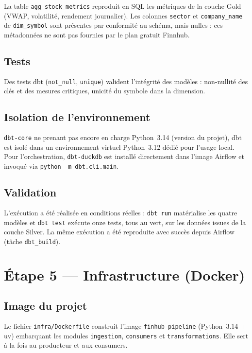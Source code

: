 \documentclass[11pt,a4paper]{article}
\newcommand{\code}[1]{\texttt{\small #1}}
\begin{document}
La table \code{agg\_stock\_metrics} reproduit en SQL les métriques de la couche
Gold (VWAP, volatilité, rendement journalier). Les colonnes
\code{sector} et \code{company\_name} de \code{dim\_symbol} sont présentes par
conformité au schéma, mais nulles : ces métadonnées ne sont pas fournies par le
plan gratuit Finnhub.

\subsection{Tests}

Des tests dbt (\code{not\_null}, \code{unique}) valident l'intégrité des
modèles : non-nullité des clés et des mesures critiques, unicité du symbole dans
la dimension.

\subsection{Isolation de l'environnement}

\code{dbt-core} ne prenant pas encore en charge Python~3.14 (version du projet),
dbt est isolé dans un environnement virtuel Python~3.12 dédié pour l'usage
local. Pour l'orchestration, \code{dbt-duckdb} est installé directement dans
l'image Airflow et invoqué via \code{python -m dbt.cli.main}.

\subsection{Validation}

L'exécution a été réalisée en conditions réelles : \code{dbt run} matérialise
les quatre modèles et \code{dbt test} exécute onze tests, tous au vert, sur les
données issues de la couche Silver. La même exécution a été reproduite avec
succès depuis Airflow (tâche \code{dbt\_build}).

\section{Étape 5 — Infrastructure (Docker)}

\subsection{Image du projet}

Le fichier \code{infra/Dockerfile} construit l'image \code{finhub-pipeline}
(Python~3.14 + uv) embarquant les modules \code{ingestion}, \code{consumers} et
\code{transformations}. Elle sert à la fois au producteur et aux consumers.
\end{document}
